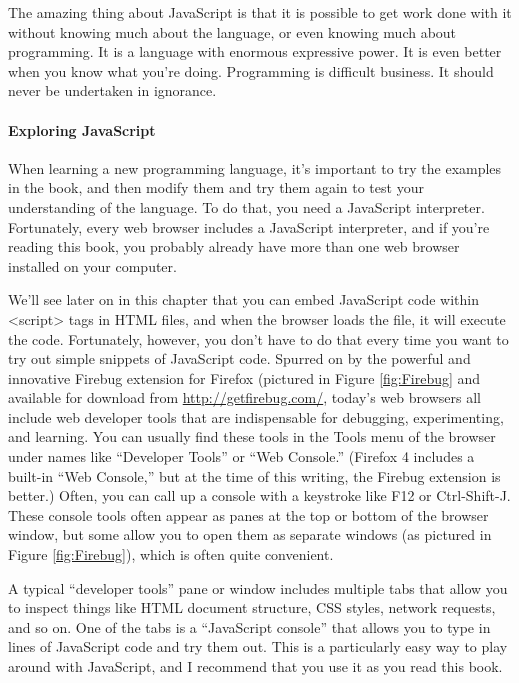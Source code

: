 The amazing thing about JavaScript is that it is possible to get work done with it
without knowing much about the language, or even knowing much about programming.
It is a language with enormous expressive power. It is even better when you
know what you’re doing. Programming is difficult business. It should never be
undertaken in ignorance.

\paragraph*{Exploring JavaScript}
\hfill \break
When learning a new programming language, it’s important to try the examples in the
book, and then modify them and try them again to test your understanding of the
language. To do that, you need a JavaScript interpreter. Fortunately, every web browser
includes a JavaScript interpreter, and if you’re reading this book, you probably already
have more than one web browser installed on your computer.

We’ll see later on in this chapter that you can embed JavaScript code within <script>
tags in HTML files, and when the browser loads the file, it will execute the code. Fortunately,
however, you don’t have to do that every time you want to try out simple
snippets of JavaScript code. Spurred on by the powerful and innovative Firebug extension
for Firefox (pictured in Figure \ref{fig:Firebug} and available for download from \href{http://getfirebug.com/}{http://getfirebug.com/}, today’s web browsers all include web developer tools that are indispensable for
debugging, experimenting, and learning. You can usually find these tools in the Tools
menu of the browser under names like “Developer Tools” or “Web Console.”
(Firefox 4 includes a built-in “Web Console,” but at the time of this writing, the Firebug
extension is better.) Often, you can call up a console with a keystroke like F12 or Ctrl-Shift-J.
These console tools often appear as panes at the top or bottom of the browser
window, but some allow you to open them as separate windows (as pictured in Figure
\ref{fig:Firebug}), which is often quite convenient.


A typical “developer tools” pane or window includes multiple tabs that allow you to
inspect things like HTML document structure, CSS styles, network requests, and so
on. One of the tabs is a “JavaScript console” that allows you to type in lines of JavaScript
code and try them out. This is a particularly easy way to play around with JavaScript,
and I recommend that you use it as you read this book.


